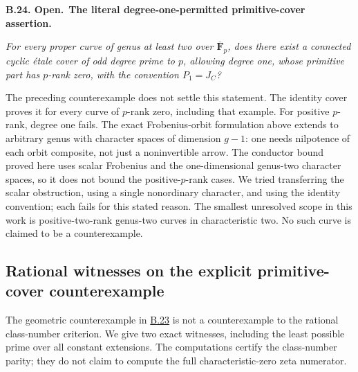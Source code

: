 \documentclass[11pt,a4paper]{article}
\newenvironment{claim}[3]{\par\medskip\noindent\hypertarget{#1}{\textbf{#1. #2.}}\ \textbf{#3.}\par\nopagebreak\smallskip\begingroup\itshape}{\endgroup\par\smallskip}
\newcommand{\statementref}[1]{\hyperlink{#1}{#1}}
\begin{document}
\begin{claim}{B.24}{Open}{The literal degree-one-permitted primitive-cover assertion}
For every proper curve of genus at least two over
$\overline{\mathbf F}_p$, does there exist a connected cyclic
\emph{\'etale} cover of odd degree prime to $p$, allowing degree one,
whose primitive part has $p$-rank zero, with the convention
$P_1=J_C$?
\end{claim}
The preceding counterexample does not settle this statement.
The identity cover proves it for every curve of $p$-rank zero,
including that example. For positive $p$-rank, degree one fails.
The exact Frobenius-orbit formulation above extends to arbitrary
genus with character spaces of dimension $g-1$: one needs
nilpotence of each orbit composite, not just a noninvertible
arrow. The conductor bound proved here uses scalar Frobenius
and the one-dimensional genus-two character spaces, so it does
not bound the positive-$p$-rank cases. We tried transferring the
scalar obstruction, using a single nonordinary character, and
using the identity convention; each fails for this stated reason.
The smallest unresolved scope in this work is positive-two-rank
genus-two curves in characteristic two. No such curve is claimed
to be a counterexample.



\subsection{Rational witnesses on the explicit primitive-cover counterexample}

The geometric counterexample in \statementref{B.23} is not a counterexample
to the rational class-number criterion. We give two exact witnesses,
including the least possible prime over all constant extensions.
The computations certify the class-number parity; they do not claim
to compute the full characteristic-zero zeta numerator.
\end{document}
